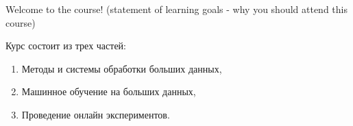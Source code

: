 Welcome to the course!
(statement of learning goals - why you should attend this course)

Курс состоит из трех частей:
\begin{enumerate}
    \item Методы и системы обработки больших данных,
    \item Машинное обучение на больших данных,
    \item Проведение онлайн экспериментов.
\end{enumerate}